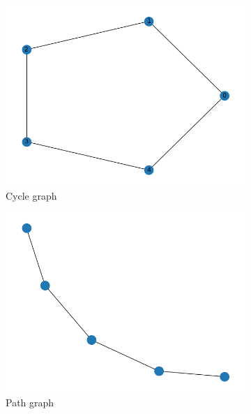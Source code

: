 \documentclass[a4paper,11pt,oneside]{book}
\begin{document}
\begin{figure}[H]
\centering
    \begin{subfigure}{0.32\textwidth}
    \includegraphics[width=\textwidth]{figs/Test_cycle_200/Graph.png}
    \caption{Cycle graph}
    \end{subfigure}
\hfill
    \begin{subfigure}{0.32\textwidth}
    \includegraphics[width=\textwidth]{figs/Test_path_200/Graph.png}
    \caption{Path graph}
    \end{subfigure}
\hfill
    \begin{subfigure}{0.32\textwidth}

\end{subfigure}
\end{figure}
\end{document}
